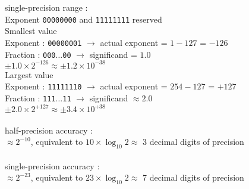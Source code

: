 \documentclass[12pt, a4paper]{article}
\begin{document}
\begin{itemize}[font=\bfseries]
single-precision range : \\
Exponent \texttt{00000000} and \texttt{11111111} reserved \\
Smallest value \\
\hspace*{0.5cm} Exponent : \texttt{00000001} $\rightarrow$ actual exponent = $1 - 127$ = $-126$ \\
\hspace*{0.5cm} Fraction : \texttt{000$\ldots$00} $\rightarrow$ significand = $1.0$ \\
\hspace*{0.5cm} $\pm 1.0 \times 2^{-126} \approx \pm 1.2 \times 10^{-38}$ \\ 
Largest value \\
\hspace*{0.5cm} Exponent : \texttt{11111110} $\rightarrow$ actual exponent = $254 - 127$ = $+127$ \\
\hspace*{0.5cm} Fraction : \texttt{111$\ldots$11} $\rightarrow$ significand $\approx 2.0$ \\
\hspace*{0.5cm} $\pm 2.0 \times 2^{+127} \approx \pm 3.4 \times 10^{+38}$ \\
\vspace*{-0.3cm} \\
half-precision accuracy : \\
$\approx 2^{-10}$, equivalent to $10 \times \log_{10} 2 \approx$ 3 decimal digits of precision \\
\vspace*{-0.3cm} \\ 
single-precision accuracy : \\
$\approx 2^{-23}$, equivalent to $23 \times \log_{10} 2 \approx$ 7 decimal digits of precision \\

\end{itemize}
\end{document}
